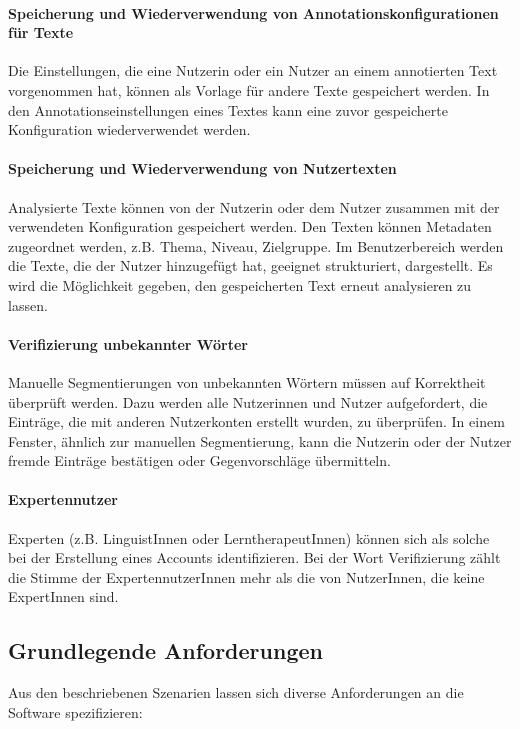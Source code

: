 \paragraph{Speicherung und Wiederverwendung von Annotationskonfigurationen für Texte}
Die Einstellungen, die eine Nutzerin oder ein Nutzer an einem annotierten Text vorgenommen hat, können als Vorlage für andere Texte gespeichert werden. In den Annotationseinstellungen eines Textes kann eine zuvor gespeicherte Konfiguration wiederverwendet werden.

\paragraph{Speicherung und Wiederverwendung von Nutzertexten}
Analysierte Texte können von der Nutzerin oder dem Nutzer zusammen mit der verwendeten Konfiguration gespeichert werden. Den Texten können Metadaten zugeordnet werden, z.B. Thema, Niveau, Zielgruppe. Im Benutzerbereich werden die Texte, die der Nutzer hinzugefügt hat, geeignet strukturiert, dargestellt. Es wird die Möglichkeit gegeben, den gespeicherten Text erneut analysieren zu lassen.

\paragraph{Verifizierung unbekannter Wörter}
Manuelle Segmentierungen von unbekannten Wörtern müssen auf Korrektheit überprüft werden. Dazu werden alle Nutzerinnen und Nutzer aufgefordert, die Einträge, die mit anderen Nutzerkonten erstellt wurden, zu überprüfen. In einem Fenster, ähnlich zur manuellen Segmentierung, kann die Nutzerin oder der Nutzer fremde Einträge bestätigen oder Gegenvorschläge übermitteln.

\paragraph{Expertennutzer}
Experten (z.B. LinguistInnen oder LerntherapeutInnen) können sich als solche bei der Erstellung eines Accounts identifizieren. Bei der Wort Verifizierung zählt die Stimme der ExpertennutzerInnen mehr als die von NutzerInnen, die keine ExpertInnen sind.

\subsection*{Grundlegende Anforderungen}

Aus den beschriebenen Szenarien lassen sich diverse Anforderungen an die Software spezifizieren:

